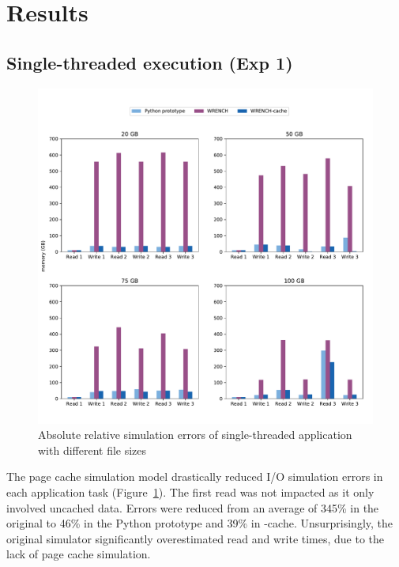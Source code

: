
\section{Results}

\subsection{Single-threaded execution (Exp 1)}

\begin{figure}[!h]
     \centering
     \includegraphics[width=\linewidth]{figures/single_errors_full.pdf}
     \caption{Absolute relative simulation errors of single-threaded application 
     with different file sizes}
     \label{fig:single_error}
\end{figure}

The page cache simulation model drastically reduced I/O simulation
errors in each application task (Figure~\ref{fig:single_error}). 
The first read was not impacted as it only involved uncached data. 
Errors were reduced from an average of 345\% in the original 
\wrench to 46\% in the Python prototype and 39\% in \wrench-cache. 
Unsurprisingly, the original \wrench simulator significantly overestimated 
read and write times, due to the lack of page cache simulation. 

